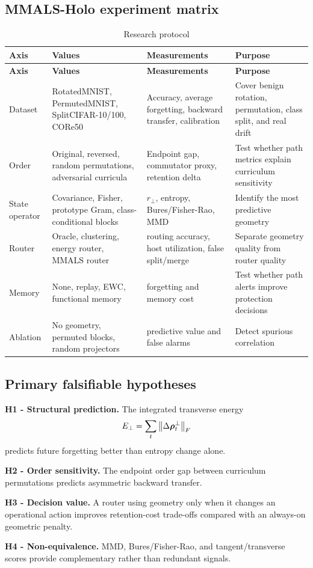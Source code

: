 \subsection{MMALS-Holo experiment matrix}

\begin{longtable}{p{} p{} p{} p{}}
\caption{Research protocol}\label{tab:protocol}\\
\toprule
\textbf{Axis} & \textbf{Values} & \textbf{Measurements} & \textbf{Purpose} \\
\midrule
\endfirsthead
\toprule
\textbf{Axis} & \textbf{Values} & \textbf{Measurements} & \textbf{Purpose} \\
\midrule
\endhead
Dataset & RotatedMNIST, PermutedMNIST, SplitCIFAR-10/100, CORe50 & Accuracy, average forgetting, backward transfer, calibration & Cover benign rotation, permutation, class split, and real drift \\
Order & Original, reversed, random permutations, adversarial curricula & Endpoint gap, commutator proxy, retention delta & Test whether path metrics explain curriculum sensitivity \\
State operator & Covariance, Fisher, prototype Gram, class-conditional blocks & $r_\perp$, entropy, Bures/Fisher-Rao, MMD & Identify the most predictive geometry \\
Router & Oracle, clustering, energy router, MMALS router & routing accuracy, host utilization, false split/merge & Separate geometry quality from router quality \\
Memory & None, replay, EWC, functional memory & forgetting and memory cost & Test whether path alerts improve protection decisions \\
Ablation & No geometry, permuted blocks, random projectors & predictive value and false alarms & Detect spurious correlation \\
\bottomrule
\end{longtable}

\subsection{Primary falsifiable hypotheses}

\begin{researchbox}
\textbf{H1 - Structural prediction.} The integrated transverse energy
\[
E_\perp=\sum_t\left\lVert \Delta\bm{\rho}_t^\perp \right\rVert_F
\]
predicts future forgetting better than entropy change alone.

\textbf{H2 - Order sensitivity.} The endpoint order gap between curriculum permutations predicts asymmetric backward transfer.

\textbf{H3 - Decision value.} A router using geometry only when it changes an operational action improves retention-cost trade-offs compared with an always-on geometric penalty.

\textbf{H4 - Non-equivalence.} MMD, Bures/Fisher-Rao, and tangent/transverse scores provide complementary rather than redundant signals.
\end{researchbox}


